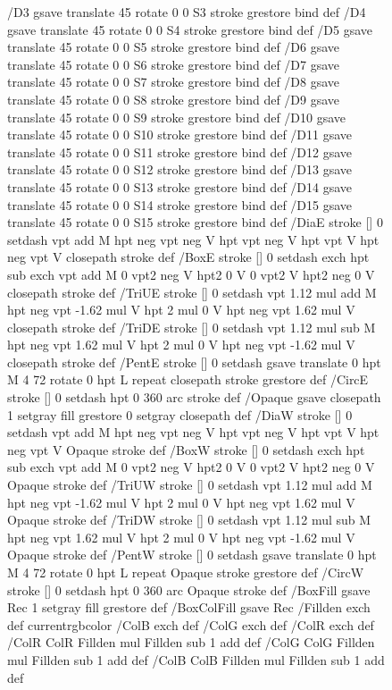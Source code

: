 \documentclass{LMCS}
\begin{document}
\begin{figure}[!tbp]
\begin{minipage}[b]{.47\linewidth}
{{{/D3 { gsave translate 45 rotate 0 0 S3 stroke grestore } bind def
/D4 { gsave translate 45 rotate 0 0 S4 stroke grestore } bind def
/D5 { gsave translate 45 rotate 0 0 S5 stroke grestore } bind def
/D6 { gsave translate 45 rotate 0 0 S6 stroke grestore } bind def
/D7 { gsave translate 45 rotate 0 0 S7 stroke grestore } bind def
/D8 { gsave translate 45 rotate 0 0 S8 stroke grestore } bind def
/D9 { gsave translate 45 rotate 0 0 S9 stroke grestore } bind def
/D10 { gsave translate 45 rotate 0 0 S10 stroke grestore } bind def
/D11 { gsave translate 45 rotate 0 0 S11 stroke grestore } bind def
/D12 { gsave translate 45 rotate 0 0 S12 stroke grestore } bind def
/D13 { gsave translate 45 rotate 0 0 S13 stroke grestore } bind def
/D14 { gsave translate 45 rotate 0 0 S14 stroke grestore } bind def
/D15 { gsave translate 45 rotate 0 0 S15 stroke grestore } bind def
/DiaE { stroke [] 0 setdash vpt add M
  hpt neg vpt neg V hpt vpt neg V
  hpt vpt V hpt neg vpt V closepath stroke } def
/BoxE { stroke [] 0 setdash exch hpt sub exch vpt add M
  0 vpt2 neg V hpt2 0 V 0 vpt2 V
  hpt2 neg 0 V closepath stroke } def
/TriUE { stroke [] 0 setdash vpt 1.12 mul add M
  hpt neg vpt -1.62 mul V
  hpt 2 mul 0 V
  hpt neg vpt 1.62 mul V closepath stroke } def
/TriDE { stroke [] 0 setdash vpt 1.12 mul sub M
  hpt neg vpt 1.62 mul V
  hpt 2 mul 0 V
  hpt neg vpt -1.62 mul V closepath stroke } def
/PentE { stroke [] 0 setdash gsave
  translate 0 hpt M 4 {72 rotate 0 hpt L} repeat
  closepath stroke grestore } def
/CircE { stroke [] 0 setdash 
  hpt 0 360 arc stroke } def
/Opaque { gsave closepath 1 setgray fill grestore 0 setgray closepath } def
/DiaW { stroke [] 0 setdash vpt add M
  hpt neg vpt neg V hpt vpt neg V
  hpt vpt V hpt neg vpt V Opaque stroke } def
/BoxW { stroke [] 0 setdash exch hpt sub exch vpt add M
  0 vpt2 neg V hpt2 0 V 0 vpt2 V
  hpt2 neg 0 V Opaque stroke } def
/TriUW { stroke [] 0 setdash vpt 1.12 mul add M
  hpt neg vpt -1.62 mul V
  hpt 2 mul 0 V
  hpt neg vpt 1.62 mul V Opaque stroke } def
/TriDW { stroke [] 0 setdash vpt 1.12 mul sub M
  hpt neg vpt 1.62 mul V
  hpt 2 mul 0 V
  hpt neg vpt -1.62 mul V Opaque stroke } def
/PentW { stroke [] 0 setdash gsave
  translate 0 hpt M 4 {72 rotate 0 hpt L} repeat
  Opaque stroke grestore } def
/CircW { stroke [] 0 setdash 
  hpt 0 360 arc Opaque stroke } def
/BoxFill { gsave Rec 1 setgray fill grestore } def
/BoxColFill {
  gsave Rec
  /Fillden exch def
  currentrgbcolor
  /ColB exch def /ColG exch def /ColR exch def
  /ColR ColR Fillden mul Fillden sub 1 add def
  /ColG ColG Fillden mul Fillden sub 1 add def
  /ColB ColB Fillden mul Fillden sub 1 add def
}}}}
\end{minipage}
\end{figure}
\end{document}
